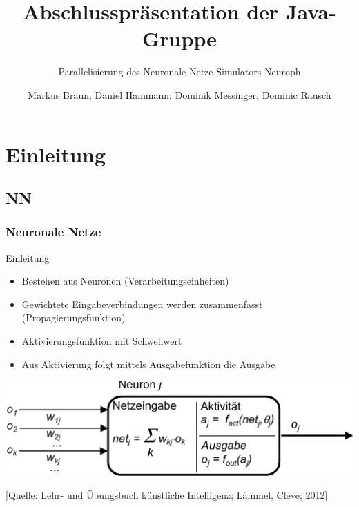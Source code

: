 \documentclass[18pt]{beamer}
\title[Paralellisierung neuronaler Netze]{Abschlusspräsentation der Java-Gruppe}
\subtitle{Parallelisierung des Neuronale Netze Simulators Neuroph}
\author[M. Braun, D. Hammann, D. Messinger, D. Rausch]{Markus Braun, Daniel Hammann, Dominik Messinger, Dominic Rausch}
\institute{Institut für Programmstrukturen und Datenorganisation (IPD), Lehrstuhl für Programmiersysteme}
\begin{document}
	\maketitle
	
	\section{Einleitung}
	\subsection{NN}
	\begin{frame}[c]\frametitle{Neuronale Netze}
		\begin{block}{Einleitung}
		    \begin{itemize}
			    \item Bestehen aus Neuronen (Verarbeitungseinheiten)
		    	\item Gewichtete Eingabeverbindungen werden zusammenfasst (Propagierungsfunktion)
		    	\item Aktivierungsfunktion mit Schwellwert
		    	\item Aus Aktivierung folgt mittels Ausgabefunktion die Ausgabe
		    \end{itemize}		    
		\end{block}	
		\vspace{.2cm}
		\begin{center}
		\begin{minipage}[c]{0.7\textwidth}
			\includegraphics[width=\textwidth]{images/Neuron}
		\end{minipage}
		\vspace{.5cm}
		\break
		\tiny{[Quelle: Lehr- und Übungsbuch künstliche Intelligenz; Lämmel, Cleve; 2012]}
		\end{center}	
	\end{frame}

		
\end{document}
